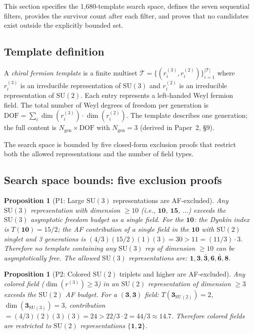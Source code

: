 \documentclass[11pt,a4paper]{article}
\newtheorem{proposition}[theorem]{Proposition}
\theoremstyle{definition}
\newcommand{\SU}{\mathrm{SU}}
\begin{document}
This section specifies the 1{,}680-template search space, defines the
seven sequential filters, provides the survivor count after each filter,
and proves that no candidates exist outside the explicitly bounded set.


\subsection{Template definition}
\label{sec:template_def}

A \emph{chiral fermion template} is a finite multiset
$\mathcal{T} = \{(r_i^{(3)}, r_i^{(2)})\}_{i=1}^{|\mathcal{T}|}$
where $r_i^{(3)}$ is an irreducible representation of $\SU(3)$ and
$r_i^{(2)}$ is an irreducible representation of $\SU(2)$.  Each entry
represents a left-handed Weyl fermion field.  The total number of Weyl
degrees of freedom per generation is
$\mathrm{DOF} = \sum_i \dim(r_i^{(3)}) \cdot \dim(r_i^{(2)})$.
The template describes one generation; the full content is
$N_{\mathrm{gen}} \times \mathrm{DOF}$ with $N_{\mathrm{gen}} = 3$
(derived in Paper~2, \S9).

The search space is bounded by five closed-form exclusion proofs that
restrict both the allowed representations and the number of field types.


\subsection{Search space bounds: five exclusion proofs}
\label{sec:exclusion_proofs}

\begin{proposition}[P1: Large $\SU(3)$ representations are AF-excluded]
\label{prop:P1}
Any $\SU(3)$ representation with dimension $\ge 10$ (i.e.,
$\mathbf{10}$, $\mathbf{15}$, $\ldots$) exceeds the $\SU(3)$
asymptotic freedom budget as a single field.  For the $\mathbf{10}$:
the Dynkin index is $T(\mathbf{10}) = 15/2$; the AF contribution of
a single field in the $\mathbf{10}$ with $\SU(2)$ singlet and 3
generations is $(4/3)(15/2)(1)(3) = 30 > 11 = (11/3) \cdot 3$.
Therefore no template containing any $\SU(3)$ rep of dimension
$\ge 10$ can be asymptotically free.  The allowed $\SU(3)$
representations are: $\mathbf{1}, \mathbf{3}, \bar{\mathbf{3}},
\mathbf{6}, \bar{\mathbf{6}}, \mathbf{8}$.
\end{proposition}

\begin{proposition}[P2: Colored $\SU(2)$ triplets and higher are AF-excluded]
\label{prop:P2}
Any colored field ($\dim(r^{(3)}) \ge 3$) in an $\SU(2)$
representation of dimension $\ge 3$ exceeds the $\SU(2)$ AF budget.
For a $(\mathbf{3}, \mathbf{3})$ field: $T(\mathbf{3}_{\SU(2)}) = 2$,
$\dim(\mathbf{3}_{\SU(3)}) = 3$, contribution $= (4/3)(2)(3)(3) = 24
> 22/3 \cdot 2 = 44/3 \approx 14.7$.  Therefore colored fields are
restricted to $\SU(2)$ representations $\{\mathbf{1}, \mathbf{2}\}$.
\end{proposition}
\end{document}
